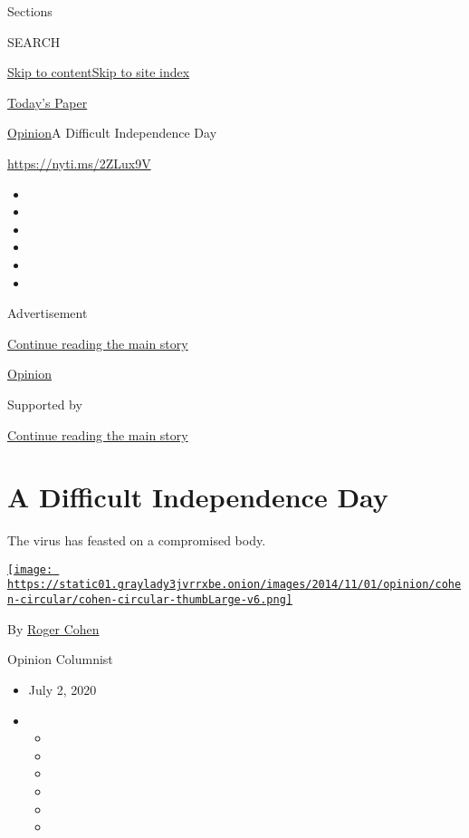 Sections

SEARCH

\protect\hyperlink{site-content}{Skip to
content}\protect\hyperlink{site-index}{Skip to site index}

\href{https://myaccount.nytimes3xbfgragh.onion/auth/login?response_type=cookie\&client_id=vi}{}

\href{https://www.nytimes3xbfgragh.onion/section/todayspaper}{Today's
Paper}

\href{/section/opinion}{Opinion}\textbar{}A Difficult Independence Day

\url{https://nyti.ms/2ZLux9V}

\begin{itemize}
\item
\item
\item
\item
\item
\item
\end{itemize}

Advertisement

\protect\hyperlink{after-top}{Continue reading the main story}

\href{/section/opinion}{Opinion}

Supported by

\protect\hyperlink{after-sponsor}{Continue reading the main story}

\hypertarget{a-difficult-independence-day}{%
\section{A Difficult Independence
Day}\label{a-difficult-independence-day}}

The virus has feasted on a compromised body.

\href{https://www.nytimes3xbfgragh.onion/by/roger-cohen}{\texttt{[image: https://static01.graylady3jvrrxbe.onion/images/2014/11/01/opinion/cohen-circular/cohen-circular-thumbLarge-v6.png]}}

By \href{https://www.nytimes3xbfgragh.onion/by/roger-cohen}{Roger Cohen}

Opinion Columnist

\begin{itemize}
\item
  July 2, 2020
\item
  \begin{itemize}
  \item
  \item
  \item
  \item
  \item
  \item
  \end{itemize}
\end{itemize}

